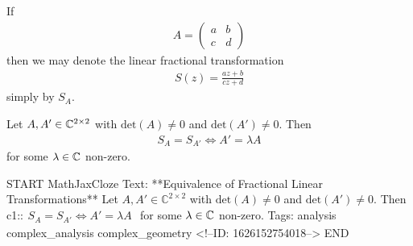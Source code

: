 \documentclass{memoir}
\begin{document}
If
\begin{align*}
	A = \begin{pmatrix} a & b \\ c & d \end{pmatrix} 
\end{align*}
then we may denote the linear fractional transformation
\begin{align*}
	S(z) = \frac{az+b}{cz+d}
\end{align*}
simply by \(S_A\).

\begin{prop}
	Let \(A,A' \in \mathbb{C}^{2\times 2}\) with \(\textrm{det}(A)\neq 0\) and \(\textrm{det}(A') \neq 0\). Then
	\begin{align*}
		S_A = S_{A'} \iff A' = \lambda A
	\end{align*} 
	for some \(\lambda \in \mathbb{C}\) non-zero.
\end{prop}

\begin{anki}
START
MathJaxCloze
Text: **Equivalence of Fractional Linear Transformations**
Let \(A,A' \in \mathbb{C}^{2\times 2}\) with \(\textrm{det}(A)\neq 0\) and \(\textrm{det}(A') \neq 0\). Then
{{c1::\(\begin{align*}
        	S_A = S_{A'} \iff A' = \lambda A
        \end{align*} \)}}
	for some \(\lambda \in \mathbb{C}\) non-zero.
Tags: analysis complex_analysis complex_geometry
<!--ID: 1626152754018-->
END
\end{anki}
\end{document}
